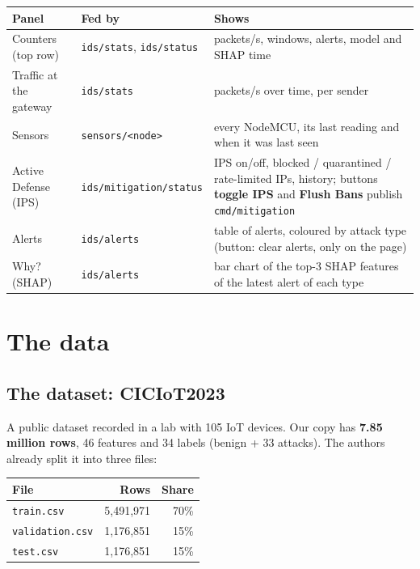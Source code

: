 \documentclass[11pt,a4paper]{article}
\newcommand{\file}[1]{\texttt{\small #1}}
\newcommand{\tablestart}{\Needspace{8\baselineskip}}
\begin{document}
\tablestart
\begin{center}
\begin{tabularx}{\linewidth}{P{4.6cm}P{4.2cm}L}
\toprule
Panel & Fed by & Shows \\
\midrule
Counters (top row) & \file{ids/stats}, \file{ids/status} & packets/s, windows, alerts, model and SHAP time \\
Traffic at the gateway & \file{ids/stats} & packets/s over time, per sender \\
Sensors & \file{sensors/<node>} & every NodeMCU, its last reading and when it was last seen \\
Active Defense (IPS) & \file{ids/mitigation/status} & IPS on/off, blocked / quarantined / rate-limited IPs, history;
buttons \textbf{toggle IPS} and \textbf{Flush Bans} publish \file{cmd/mitigation} \\
Alerts & \file{ids/alerts} & table of alerts, coloured by attack type (button: clear alerts, only on the page) \\
Why? (SHAP) & \file{ids/alerts} & bar chart of the top-3 SHAP features of the latest alert of each type \\
\bottomrule
\end{tabularx}
\end{center}

\section{The data}

\subsection{The dataset: CICIoT2023}

A public dataset recorded in a lab with 105 IoT devices. Our copy has \textbf{7.85 million rows}, 46 features and
34 labels (benign + 33 attacks). The authors already split it into three files:

\begin{center}
\begin{tabular}{lrr}
\toprule
File & Rows & Share \\
\midrule
\file{train.csv} & 5,491,971 & 70\% \\
\file{validation.csv} & 1,176,851 & 15\% \\
\file{test.csv} & 1,176,851 & 15\% \\
\bottomrule
\end{tabular}
\end{center}
\end{document}
